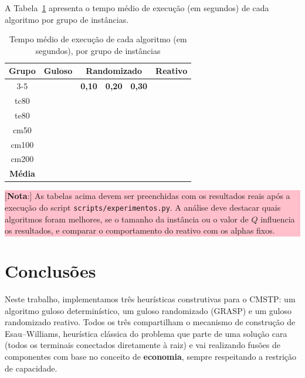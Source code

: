 \documentclass[12pt]{article}
\begin{document}
A Tabela~\ref{tabResultTempo} apresenta o tempo médio de execução (em segundos) de cada algoritmo por grupo de instâncias.

\begin{table}[htbp]
\centering
\caption{Tempo médio de execução de cada algoritmo (em segundos), por grupo de instâncias}
\renewcommand{\arraystretch}{1.2}
{
\footnotesize
\begin{tabular}{|c|c|c|c|c|c|}
\hline
\textbf{Grupo} & \textbf{Guloso} & \multicolumn{3}{c|}{\textbf{Randomizado}} & \textbf{Reativo} \\ \cline{3-5}
 & & \multicolumn{1}{c|}{\textbf{0,10}} & \multicolumn{1}{c|}{\textbf{0,20}} & \multicolumn{1}{c|}{\textbf{0,30}} & \\
\hline
tc80  &  &  &  &  &  \\
te80  &  &  &  &  &  \\
cm50  &  &  &  &  &  \\
cm100 &  &  &  &  &  \\
cm200 &  &  &  &  &  \\
\hline
\textbf{Média} &  &  &  &  &  \\
\hline
\end{tabular}
}
\label{tabResultTempo}
\end{table}

\colorbox{pink}{
\begin{minipage}[c]{13cm}
[\textbf{Nota}:] As tabelas acima devem ser preenchidas com os resultados reais após a execução do script \texttt{scripts/experimentos.py}. A análise deve destacar quais algoritmos foram melhores, se o tamanho da instância ou o valor de $Q$ influencia os resultados, e comparar o comportamento do reativo com os alphas fixos.
\end{minipage}}


\section{Conclusões}
\label{secConclusoes}

Neste trabalho, implementamos três heurísticas construtivas para o CMSTP: um algoritmo guloso determinístico, um guloso randomizado (GRASP) e um guloso randomizado reativo. Todos os três compartilham o mecanismo de construção de Esau--Williams, heurística clássica do problema que parte de uma solução cara (todos os terminais conectados diretamente à raiz) e vai realizando fusões de componentes com base no conceito de \textbf{economia}, sempre respeitando a restrição de capacidade.
\end{document}
